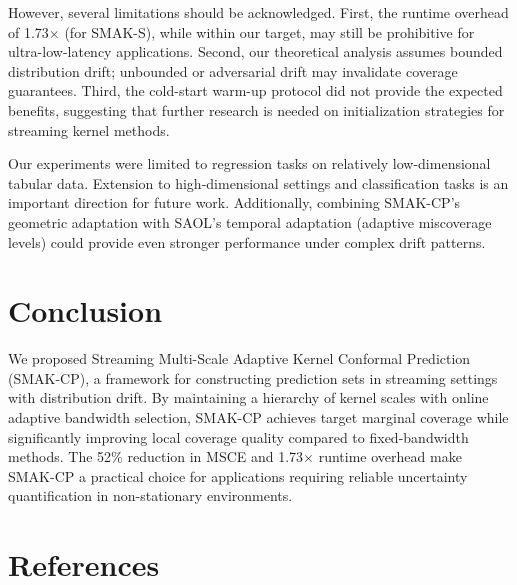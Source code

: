 \documentclass{article}
\theoremstyle{definition}
\begin{document}
However, several limitations should be acknowledged. First, the runtime overhead of 1.73$\times$ (for SMAK-S), while within our target, may still be prohibitive for ultra-low-latency applications. Second, our theoretical analysis assumes bounded distribution drift; unbounded or adversarial drift may invalidate coverage guarantees. Third, the cold-start warm-up protocol did not provide the expected benefits, suggesting that further research is needed on initialization strategies for streaming kernel methods.

Our experiments were limited to regression tasks on relatively low-dimensional tabular data. Extension to high-dimensional settings and classification tasks is an important direction for future work. Additionally, combining SMAK-CP's geometric adaptation with SAOL's temporal adaptation (adaptive miscoverage levels) could provide even stronger performance under complex drift patterns.

\section{Conclusion}

We proposed Streaming Multi-Scale Adaptive Kernel Conformal Prediction (SMAK-CP), a framework for constructing prediction sets in streaming settings with distribution drift. By maintaining a hierarchy of kernel scales with online adaptive bandwidth selection, SMAK-CP achieves target marginal coverage while significantly improving local coverage quality compared to fixed-bandwidth methods. The 52\% reduction in MSCE and 1.73$\times$ runtime overhead make SMAK-CP a practical choice for applications requiring reliable uncertainty quantification in non-stationary environments.

\section*{References}
\end{document}

